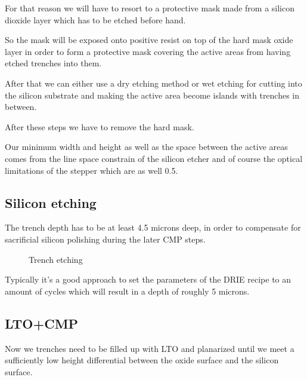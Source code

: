 For that reason we will have to resort to a protective mask made from a silicon dioxide layer which has to be etched before hand.

So the mask will be exposed onto positive resist on top of the hard mask oxide layer in order to form a protective mask covering the active areas from having etched trenches into them.

After that we can either use a dry etching method or wet etching for cutting into the silicon substrate and making the active area become islands with trenches in between.

After these steps we have to remove the hard mask.

Our minimum width and height as well as the space between the active areas comes from the line space constrain of the silicon etcher and of course the optical limitations of the stepper which are as well 0.5\um.

\newpage

\subsection{Silicon etching}\label{sti_trench_etch}

The trench depth has to be at least 4.5 microns deep, in order to compensate for sacrificial silicon polishing during the later CMP steps.

\begin{figure}[H]
	\centering
	\begin{tikzpicture}[node distance = 3cm, auto, thick,scale=\CrossSectionOnly, every node/.style={transform shape}]
		
	\end{tikzpicture}
	\drawStepArrow{}
	\begin{tikzpicture}[node distance = 3cm, auto, thick,scale=\CrossSectionOnly, every node/.style={transform shape}]
		
	\end{tikzpicture}
	\caption{Trench etching}
\end{figure}

Typically it's a good approach to set the parameters of the DRIE recipe to an amount of cycles which will result in a depth of roughly 5 microns.


\subsection{LTO+CMP}

Now we trenches need to be filled up with LTO and planarized until we meet a sufficiently low height differential between the oxide surface and the silicon surface.

